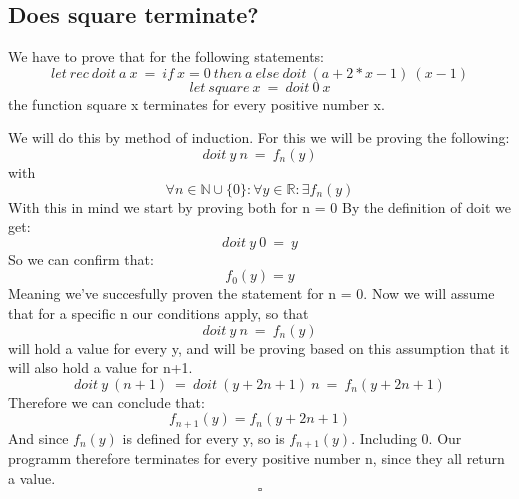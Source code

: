 \documentclass{article}
\begin{document}
\subsection{Does square terminate?}
\label{sub:Does square terminate?}
We have to prove that for the following statements:
\begin{equation}
  let\:rec\: doit\: a\: x\: =\: if\: x = 0\: then\: a\: else\: doit\: (a+2*x-1)\: (x-1)
\end{equation}
\begin{equation}
  let\: square\: x\: =\: doit\: 0\: x
\end{equation}
the function square x terminates for every positive number x.

We will do this by method of induction.
For this we will be proving the following:
\begin{equation}
  doit\: y\: n\: =\: { f }_{ n }(y)
\end{equation}
with
\begin{equation}
  \forall n \in \mathbb{N}\cup \{ 0\}  : \forall y \in \mathbb{R} : \exists { f }_{ n }(y)
\end{equation}
With this in mind we start by proving both for n = 0
By the definition of doit we get:
\begin{equation}
  doit\: y\: 0 \: = \: y
\end{equation}
So we can confirm that:
\begin{equation}
  { f }_{ 0 }(y) = y
\end{equation}
Meaning we've succesfully proven the statement for n = 0.
Now we will assume that for a specific n our conditions apply, so that
\begin{equation}
  doit\: y\: n\: =\: { f }_{ n }(y)
\end{equation}
will hold a value for every y, and will be proving based on this assumption that it will also hold a value for n+1.
\begin{equation}
  doit\: y\: (n+1)\: =\: doit\: (y+2n+1)\: n\: =\: { f }_{ n }(y+2n+1)
\end{equation}
Therefore we can conclude that:
\begin{equation}
  { f }_{ n+1 }(y) = { f }_{ n }(y+2n+1)
\end{equation}
And since ${ f }_{ n }(y)$ is defined for every y, so is ${ f }_{ n+1 }(y)$. Including 0.
Our programm therefore terminates for every positive number n, since they all return a value.
$$
\square
$$
\end{document}
